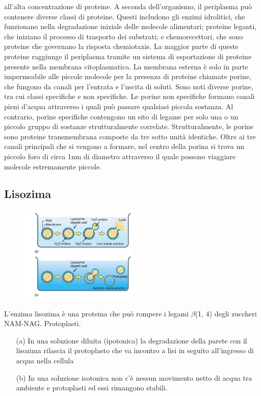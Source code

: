 all’alta concentrazione di proteine. A seconda dell'organismo, il periplasma può contenere diverse classi di proteine. Questi includono gli enzimi 
idrolitici, che funzionano nella degradazione iniziale delle molecole alimentari; proteine leganti, che iniziano il processo di trasporto dei substrati; e 
chemorecettori, che sono proteine che governano la risposta chemiotaxis. La maggior parte di queste proteine raggiunge il periplasma tramite un sistema di 
esportazione di proteine presente nella membrana citoplasmatica. La membrana esterna è solo in parte impermeabile alle piccole molecole per la presenza di 
proteine chiamate porine, che fungono da canali per l’entrata e l’uscita di soluti. Sono noti diverse porine, tra cui classi specifiche e non specifiche. Le 
porine non specifiche formano canali pieni d'acqua attraverso i quali può passare qualsiasi piccola sostanza. Al contrario, porine specifiche contengono un 
sito di legame per solo una o un piccolo gruppo di sostanze strutturalmente correlate. Strutturalmente, le porine sono proteine transmembrana composte da 
tre sotto unità identiche. Oltre ai tre canali principali che si vengono a formare, nel centro della porina si trova un piccolo foro di circa 1nm di 
diametro attraverso il quale possono viaggiare molecole estremamente piccole. 
\subsection{Lisozima}
\begin{multicols}{2}
\begin{figure}[H]
	\includegraphics[width=0.5\textwidth]{Pictures/7.png}
\end{figure} 
L’enzima lisozima è una proteina che può rompere i legami $\beta$(1, 4) degli zuccheri NAM-NAG. Protoplasti. 

\begin{itemize}
\item[(a)] In una soluzione diluita (ipotonica) la degradazione della parete con il lisozima rilascia il protoplasto che va incontro a lisi in seguito 
all’ingresso di acqua nella cellula
\item[(b)] In una soluzione isotonica non c’è nessun movimento netto di acqua tra ambiente e protoplasti ed essi rimangono stabili.
\end{itemize}
\end{multicols}
